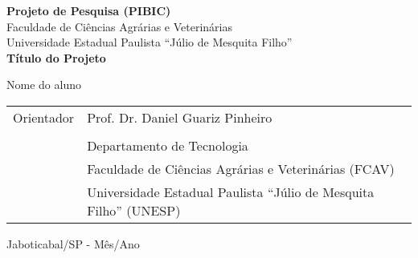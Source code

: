 \begin{titlepage}
\begin{figure}[ht]
\centering
\end{figure}
	\begin{center}
		\Large
		\textbf{Projeto de Pesquisa (PIBIC)}
		\\[1cm]
		Faculdade de Ciências Agrárias e Veterinárias\\
		Universidade Estadual Paulista ``Júlio de Mesquita Filho''
		\\[3cm]
		{\bfseries {\LARGE 
		Título do Projeto
		} }\\[3cm]
	
	\end{center}

\vspace{2cm}
  \begin{center}%
      {\LARGE \sc Nome do aluno}\\[2cm]
  \end{center}

  \begin{flushright}
    \begin{minipage}[h]{12.5cm}

\begin{tabular}{ l l }
  Orientador & Prof. Dr. Daniel Guariz Pinheiro\\
   &  \\
   &  Departamento de Tecnologia\\
   &  Faculdade de Ciências Agrárias e Veterinárias (FCAV)\\
   &  Universidade Estadual Paulista ``Júlio de Mesquita Filho'' (UNESP)\\
\end{tabular}

    \end{minipage}
  \end{flushright}

\vspace{2cm}
  \begin{center}%
	      Jaboticabal/SP - Mês/Ano
  \end{center}

\end{titlepage}
